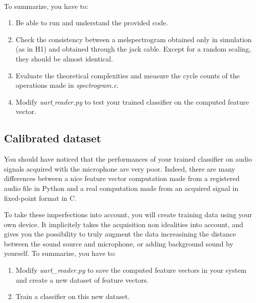 \\
%
\noindent To summarize, you have to:
\begin{enumerate}
    \item Be able to run and understand the provided code.
    \item Check the consistency between a melspectrogram obtained only in simulation (as in H1) and obtained through the jack cable. Except for a random scaling, they should be almost identical.
    \item Evaluate the theoretical complexities and measure the cycle counts of the operations made in \emph{spectrogram.c}.
    \item Modify \emph{uart$\_$reader.py} to test your trained classifier on the computed feature vector.
\end{enumerate}
%
\subsection{Calibrated dataset}
%
You should have noticed that the performances of your trained classifier on audio signals acquired with the microphone are very poor. Indeed, there are many differences between a nice feature vector computation made from a registered audio file in Python and a real computation made from an acquired signal in fixed-point format in C.

To take these imperfections into account, you will create training data using your own device. It implicitely takes the acquisition non idealities into account, and gives you the possibility to truly augment the data increasining the distance between the sound source and microphone, or adding background sound by yourself.
%
\noindent To summarize, you have to:
\begin{enumerate}
    \item Modify \emph{uart\_reader.py} to save the computed feature vectors in your system and create a new dataset of feature vectors.
    \item Train a classifier on this new dataset.
\end{enumerate}

